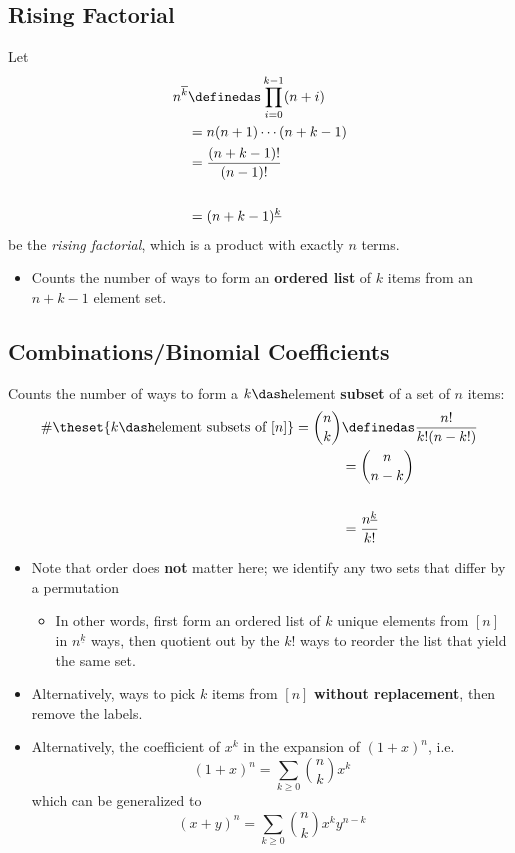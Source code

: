 \hypertarget{rising-factorial}{%
\subsection{Rising Factorial}\label{rising-factorial}}

Let \[\begin{aligned}
n^{\overline k} &\definedas \prod_{i=0}^{k-1}(n+i) \\ &=n(n+1) \cdots (n+k-1)
\\&= \frac{(n+k-1)!}{(n-1)!} \\ \\&= (n+k-1)^{\underline k}
\end{aligned}\] be the \emph{rising factorial}, which is a product with
exactly \(n\) terms.

\begin{itemize}
\tightlist
\item
  Counts the number of ways to form an \textbf{ordered list} of \(k\)
  items from an \(n+k-1\) element set.
\end{itemize}

\hypertarget{combinationsbinomial-coefficients}{%
\subsection{Combinations/Binomial
Coefficients}\label{combinationsbinomial-coefficients}}

Counts the number of ways to form a \(k\dash\)element \textbf{subset} of
a set of \(n\) items: \[
\begin{aligned}
\#\theset{k\dash\text{element subsets of } [n]} = {n \choose k} &\definedas \frac{n!}{k!(n-k!)} \\
&= {n \choose n-k} \\ \\
&= \frac{n^{\underline k}}{k!}
\end{aligned}
\]

\begin{itemize}
\tightlist
\item
  Note that order does \textbf{not} matter here; we identify any two
  sets that differ by a permutation

  \begin{itemize}
  \tightlist
  \item
    In other words, first form an ordered list of \(k\) unique elements
    from \([n]\) in \(n^{\underline k}\) ways, then quotient out by the
    \(k!\) ways to reorder the list that yield the same set.
  \end{itemize}
\item
  Alternatively, ways to pick \(k\) items from \([n]\) \textbf{without
  replacement}, then remove the labels.
\item
  Alternatively, the coefficient of \(x^k\) in the expansion of
  \((1+x)^n\), i.e. \[
  (1+x)^n = \sum_{k\geq 0} {n\choose k} x^k
  \] which can be generalized to \[
  (x+y)^n = \sum_{k\geq 0} {n\choose k} x^ky^{n-k}
  \]
\end{itemize}

